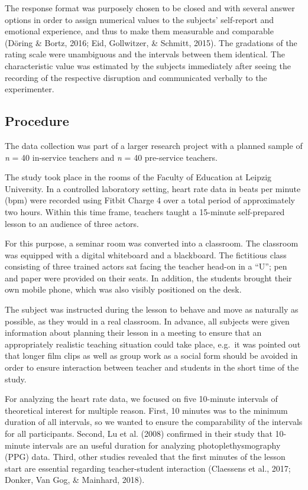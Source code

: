 \documentclass[
  man,floatsintext]{apa6}
\begin{document}
The response format was purposely chosen to be closed and with several answer options in order to assign numerical values to the subjects' self-report and emotional experience, and thus to make them measurable and comparable (Döring \& Bortz, 2016; Eid, Gollwitzer, \& Schmitt, 2015). The gradations of the rating scale were unambiguous and the intervals between them identical. The characteristic value was estimated by the subjects immediately after seeing the recording of the respective disruption and communicated verbally to the experimenter.

\hypertarget{procedure}{%
\subsection{Procedure}\label{procedure}}

The data collection was part of a larger research project with a planned sample of \emph{n} = 40 in-service teachers and \emph{n} = 40 pre-service teachers.

The study took place in the rooms of the Faculty of Education at Leipzig University. In a controlled laboratory setting, heart rate data in beats per minute (bpm) were recorded using Fitbit Charge 4 over a total period of approximately two hours. Within this time frame, teachers taught a 15-minute self-prepared lesson to an audience of three actors.

For this purpose, a seminar room was converted into a classroom. The classroom was equipped with a digital whiteboard and a blackboard. The fictitious class consisting of three trained actors sat facing the teacher head-on in a ``U''; pen and paper were provided on their seats. In addition, the students brought their own mobile phone, which was also visibly positioned on the desk.

The subject was instructed during the lesson to behave and move as naturally as possible, as they would in a real classroom. In advance, all subjects were given information about planning their lesson in a meeting to ensure that an appropriately realistic teaching situation could take place, e.g.~it was pointed out that longer film clips as well as group work as a social form should be avoided in order to ensure interaction between teacher and students in the short time of the study.

For analyzing the heart rate data, we focused on five 10-minute intervals of theoretical interest for multiple reason. First, 10 minutes was to the minimum duration of all intervals, so we wanted to ensure the comparability of the intervals for all participants. Second, Lu et al. (2008) confirmed in their study that 10-minute intervals are an useful duration for analyzing photoplethysmography (PPG) data. Third, other studies revealed that the first minutes of the lesson start are essential regarding teacher-student interaction (Claessens et al., 2017; Donker, Van Gog, \& Mainhard, 2018).
\end{document}
